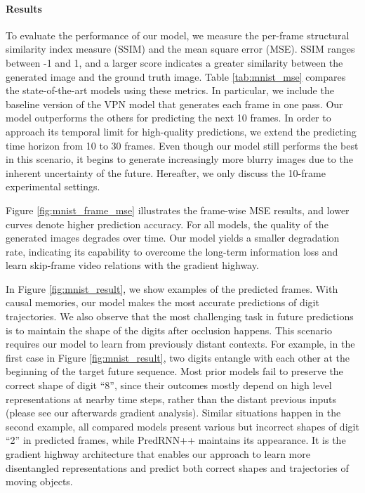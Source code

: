 \documentclass{article}
\begin{document}
\paragraph{Results} 
To evaluate the performance of our model, we measure the per-frame structural similarity index measure (SSIM) \cite{Wang2004Image} and the mean square error (MSE). SSIM ranges between -1 and 1, and a larger score indicates a greater similarity between the generated image and the ground truth image. Table \ref{tab:mnist_mse} compares the state-of-the-art models using these metrics. In particular, we include the baseline version of the VPN model \cite{Kalchbrenner2016Video} that generates each frame in one pass. Our model outperforms the others for predicting the next 10 frames. In order to approach its temporal limit for high-quality predictions, we extend the predicting time horizon from 10 to 30 frames. Even though our model still performs the best in this scenario, it begins to generate increasingly more blurry images due to the inherent uncertainty of the future. Hereafter, we only discuss the 10-frame experimental settings.



Figure \ref{fig:mnist_frame_mse} illustrates the frame-wise MSE results, and lower curves denote higher prediction accuracy. For all models, the quality of the generated images degrades over time. Our model yields a smaller degradation rate, indicating its capability to overcome the long-term information loss and learn skip-frame video relations with the gradient highway. 





In Figure \ref{fig:mnist_result}, we show examples of the predicted frames. With causal memories, our model makes the most accurate predictions of digit trajectories. We also observe that the most challenging task in future predictions is to maintain the shape of the digits after occlusion happens. This scenario requires our model to learn from previously distant contexts. For example, in the first case in Figure \ref{fig:mnist_result}, two digits entangle with each other at the beginning of the target future sequence. Most prior models fail to preserve the correct shape of digit ``8'', since their outcomes mostly depend on high level representations at nearby time steps, rather than the distant previous inputs (please see our afterwards gradient analysis). Similar situations happen in the second example, all compared models present various but incorrect shapes of digit ``2'' in predicted frames, while PredRNN++ maintains its appearance. It is the gradient highway architecture that enables our approach to learn more {disentangled representations} and predict both correct shapes and trajectories of moving objects. 
\end{document}

